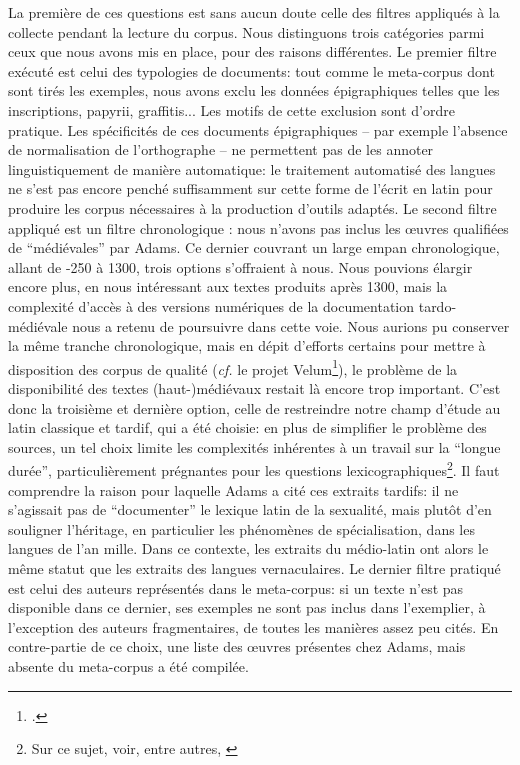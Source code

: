 La première de ces questions est sans aucun doute celle des filtres appliqués à la collecte pendant la lecture du corpus. Nous distinguons trois catégories parmi ceux que nous avons mis en place, pour des raisons différentes. Le premier filtre exécuté est celui des typologies de documents: tout comme le meta-corpus dont sont tirés les exemples, nous avons exclu les données épigraphiques telles que les inscriptions, papyrii, graffitis... Les motifs de cette exclusion sont d'ordre pratique. Les spécificités de ces documents épigraphiques -- par exemple l'absence de normalisation de l'orthographe -- ne permettent pas de les annoter linguistiquement de manière automatique: le traitement automatisé des langues ne s'est pas encore penché suffisamment sur cette forme de l'écrit en latin pour produire les corpus nécessaires à la production d'outils adaptés. Le second filtre appliqué est un filtre chronologique : nous n’avons pas inclus les œuvres qualifiées de \enquote{médiévales} par Adams. Ce dernier couvrant un large empan chronologique, allant de -250 à 1300, trois options s'offraient à nous. Nous pouvions élargir encore plus, en nous intéressant aux textes produits après 1300, mais la complexité d'accès à des versions numériques de la documentation tardo-médiévale nous a retenu de poursuivre dans cette voie. Nous aurions pu conserver la même tranche chronologique, mais en dépit d'efforts certains pour mettre à disposition des corpus de qualité (\textit{cf.} le projet Velum\footcite{bon2019challenges}), le problème de la disponibilité des textes (haut-)médiévaux restait là encore trop important. C'est donc la troisième et dernière option, celle de restreindre notre champ d'étude au latin classique et tardif, qui a été choisie: en plus de simplifier le problème des sources, un tel choix limite les complexités inhérentes à un travail sur la \enquote{longue durée}, particulièrement prégnantes pour les questions lexicographiques\footnote{Sur ce sujet, voir, entre autres, \textcite{gabay_lacteur_2015}}. Il faut comprendre la raison pour laquelle Adams a cité ces extraits tardifs: il ne s'agissait pas de \enquote{documenter} le lexique latin de la sexualité, mais plutôt d'en souligner l'héritage, en particulier les phénomènes de spécialisation, dans les langues de l'an mille. Dans ce contexte, les extraits du médio-latin ont alors le même statut que les extraits des langues vernaculaires. Le dernier filtre pratiqué est celui des auteurs représentés dans le meta-corpus: si un texte n'est pas disponible dans ce dernier, ses exemples ne sont pas inclus dans l'exemplier, à l'exception des auteurs fragmentaires,  de toutes les manières assez peu cités. En contre-partie de ce choix, une liste des œuvres présentes chez Adams, mais absente du meta-corpus a été compilée.

